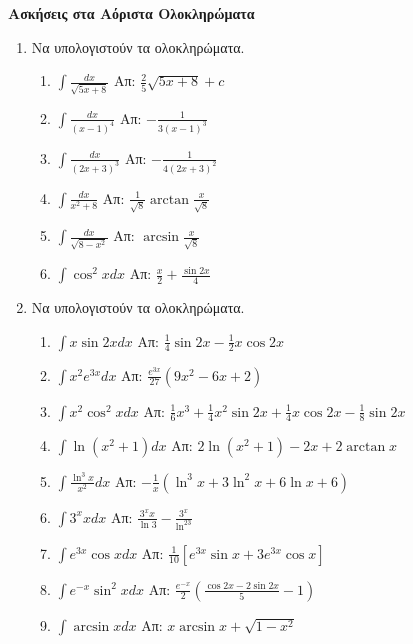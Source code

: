 




\everymath{\displaystyle}
\pagestyle{askhseis}




\begin{center}
  \bfseries \textcolor{Col1}{Ασκήσεις στα Αόριστα Ολοκληρώματα}
\end{center}

\vspace{\baselineskip}


\begin{enumerate}

\item Να υπολογιστούν τα ολοκληρώματα.


\begin{enumerate}
\item $\int \frac{dx}{\sqrt{5x+8}}$ \hfill Απ: $\frac{2}{5}\sqrt{5x+8}+c$
\item $\int\frac{dx}{(x-1)^4}$ \hfill Απ: $-\frac{1}{3(x-1)^3}$
\item $\int\frac{dx}{(2x+3)^3}$ \hfill Απ: $-\frac{1}{4(2x+3)^2}$
\item $\int\frac{dx}{x^2+8}$ \hfill Απ: $\frac{1}{\sqrt{8}} \arctan \frac{x}{\sqrt{8}}$
\item $\int\frac{dx}{\sqrt{8-x^2}}$ \hfill Απ: $\arcsin \frac{x}{\sqrt{8}}$

\item $\int \cos^2xdx$ \hfill Απ: $\frac{x}{2} + \frac{\sin2x}{4}$
\end{enumerate}

\item Να υπολογιστούν τα ολοκληρώματα.

\begin{enumerate}
\item $\int x\sin2xdx$ \hfill Απ: $\frac{1}{4}\sin2x-\frac{1}{2}x\cos2x$
\item $\int x^2e^{3x}dx$ \hfill Απ: $\frac{e^{3x}}{27}(9x^2-6x+2)$
\item $\int x^2\cos^2x dx$ \hfill Απ: $\frac{1}{6}x^3 + \frac{1}{4}x^2\sin2x+\frac{1}{4}x\cos2x-\frac{1}{8}\sin2x$ 
\item $\int \ln(x^{2}+1) dx $ \hfill Απ: $2\ln(x^{2}+1)-2x+2\arctan x$
\item $\int \frac{\ln^3x}{x^2}dx$ \hfill Απ: $-\frac{1}{x}(\ln^3x+3\ln^2x+6\ln x+6)$
\item $\int 3^xxdx$ \hfill Απ: $\frac{3^xx}{\ln3}-\frac{3^x}{\ln^23}$
\item $\int e^{3x}\cos x dx$ \hfill Απ: $\frac{1}{10}[e^{3x}\sin x + 3e^{3x}\cos x]$
\item $\int e^{-x}\sin^2xdx$ \hfill Απ: $\frac{e^{-x}}{2}\left(\frac{\cos2x-2\sin2x}{5}-1\right)$
\item $\int \arcsin x dx$ \hfill Απ: $x\arcsin x + \sqrt{1-x^2}$
\end{enumerate}


\end{enumerate}
